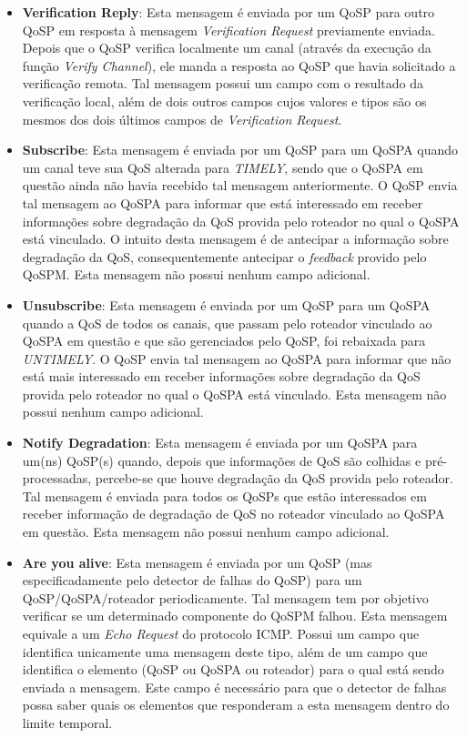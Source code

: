 \begin{itemize}
\item \textbf{Verification Reply}: Esta mensagem é enviada por um QoSP para outro QoSP em resposta à mensagem \textit{Verification Request} previamente enviada. Depois que o QoSP verifica localmente um canal (através da execução da função \textit{Verify Channel}), ele manda a resposta ao QoSP que havia solicitado a verificação remota. Tal mensagem possui um campo com o resultado da verificação local, além de dois outros campos cujos valores e tipos são os mesmos dos dois últimos campos de \textit{Verification Request}.

\item \textbf{Subscribe}: Esta mensagem é enviada por um QoSP para um QoSPA quando um canal teve sua QoS alterada para \textit{TIMELY}, sendo que o QoSPA em questão ainda não havia recebido tal mensagem anteriormente. O QoSP envia tal mensagem ao QoSPA para informar que está interessado em receber informações sobre degradação da QoS provida pelo roteador no qual o QoSPA está vinculado. O intuito desta mensagem é de antecipar a informação sobre degradação da QoS, consequentemente antecipar o \textit{feedback} provido pelo QoSPM. Esta mensagem não possui nenhum campo adicional.

\item \textbf{Unsubscribe}: Esta mensagem é enviada por um QoSP para um QoSPA quando a QoS de todos os canais, que passam pelo roteador vinculado ao QoSPA em questão e que são gerenciados pelo QoSP, foi rebaixada para \textit{UNTIMELY}. O QoSP envia tal mensagem ao QoSPA para informar que não está mais interessado em receber informações sobre degradação da QoS provida pelo roteador no qual o QoSPA está vinculado. Esta mensagem não possui nenhum campo adicional.

\item \textbf{Notify Degradation}: Esta mensagem é enviada por um QoSPA para um(ns) QoSP(s) quando, depois que informações de QoS são colhidas e pré-processadas, percebe-se que houve degradação da QoS provida pelo roteador. Tal mensagem é enviada para todos os QoSPs que estão interessados em receber informação de degradação de QoS no roteador vinculado ao QoSPA em questão. Esta mensagem não possui nenhum campo adicional.

\item \textbf{Are you alive}: Esta mensagem é enviada por um QoSP (mas especificadamente pelo detector de falhas do QoSP) para um QoSP/QoSPA/roteador periodicamente. Tal mensagem tem por objetivo verificar se um determinado componente do QoSPM falhou. Esta mensagem equivale a um \textit{Echo Request} do protocolo ICMP. Possui um campo que identifica unicamente uma mensagem deste tipo, além de um campo que identifica o elemento (QoSP ou QoSPA ou roteador) para o qual está sendo enviada a mensagem. Este campo é necessário para que o detector de falhas possa saber quais os elementos que responderam a esta mensagem dentro do limite temporal.


\end{itemize}
